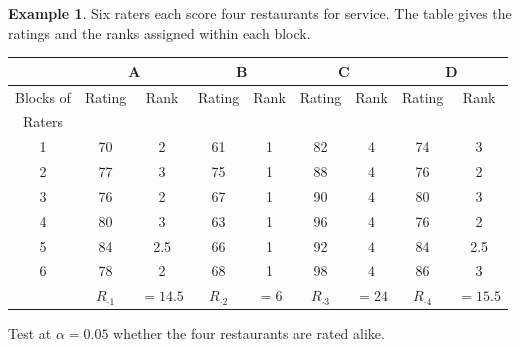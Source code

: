 \documentclass[11pt,a4paper]{article}
\theoremstyle{definition}
\newtheorem{example}[thm]{Example}
\begin{document}
\begin{example}
Six raters each score four restaurants for service. The table gives the ratings and
the ranks assigned within each block.

\begin{table}[H]
\centering
{}
\begin{tabular}{|c|cc|cc|cc|cc|}
\hline &\multicolumn{2}{c|}{A} &\multicolumn{2}{c|}{B} &\multicolumn{2}{c|}{C} &\multicolumn{2}{c|}{D} \\
\hline Blocks of&Rating&Rank&Rating&Rank&Rating&Rank&Rating&Rank\\
Raters&&&&&&&&\\
\hline 1&70&2&61&1&82&4&74&3\\
2&77&3&75&1&88&4&76&2\\
3&76&2&67&1&90&4&80&3\\
4&80&3&63&1&96&4&76&2\\
5&84&2.5&66&1&92&4&84&2.5\\
6&78&2&68&1&98&4&86&3\\
\hline &$R_{\cdot 1}$&$=14.5$&$R_{\cdot 2}$&$=6$&$R_{\cdot 3}$&$=24$&$R_{\cdot 4}$&$=15.5$\\
\hline
\end{tabular}
\end{table}

Test at $\alpha=0.05$ whether the four restaurants are rated alike.
\end{example}
\end{document}
